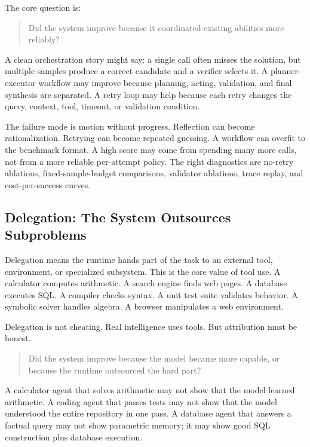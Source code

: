 The core question is:

\begin{quote}
Did the system improve because it coordinated existing abilities more reliably?
\end{quote}

A clean orchestration story might say: a single call often misses the solution, but multiple samples produce a correct candidate and a verifier selects it. A planner-executor workflow may improve because planning, acting, validation, and final synthesis are separated. A retry loop may help because each retry changes the query, context, tool, timeout, or validation condition.

The failure mode is motion without progress. Reflection can become rationalization. Retrying can become repeated guessing. A workflow can overfit to the benchmark format. A high score may come from spending many more calls, not from a more reliable per-attempt policy. The right diagnostics are no-retry ablations, fixed-sample-budget comparisons, validator ablations, trace replay, and cost-per-success curves.

\subsection{Delegation: The System Outsources Subproblems}

Delegation means the runtime hands part of the task to an external tool, environment, or specialized subsystem. This is the core value of tool use. A calculator computes arithmetic. A search engine finds web pages. A database executes SQL. A compiler checks syntax. A unit test suite validates behavior. A symbolic solver handles algebra. A browser manipulates a web environment.

Delegation is not cheating. Real intelligence uses tools. But attribution must be honest.

\begin{quote}
Did the system improve because the model became more capable, or because the runtime outsourced the hard part?
\end{quote}

A calculator agent that solves arithmetic may not show that the model learned arithmetic. A coding agent that passes tests may not show that the model understood the entire repository in one pass. A database agent that answers a factual query may not show parametric memory; it may show good SQL construction plus database execution.

